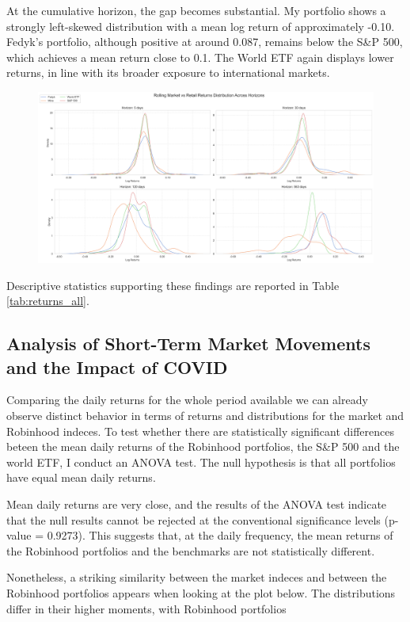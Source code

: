 At the cumulative horizon, the gap becomes substantial. My portfolio shows a strongly left-skewed distribution with a mean log return of approximately -0.10.
Fedyk’s portfolio, although positive at around 0.087, remains below the S\&P 500, which achieves a mean return close to 0.1. 
The World ETF again displays lower returns, in line with its broader exposure to international markets.
\begin{figure}[h!]
    \centering
    \includegraphics[width=1\linewidth]
    {../images/distributions/comparison_2.png}
\end{figure}

Descriptive statistics supporting these findings are reported in Table \ref{tab:returns_all}.

\subsection{Analysis of Short-Term Market Movements and the Impact of COVID}
Comparing the daily returns for the whole period available we can already observe distinct behavior in terms of returns and distributions for the market and Robinhood indeces.
To test whether there are statistically significant differences beteen the mean daily returns of the Robinhood portfolios, the S\&P 500 and the world ETF, I conduct an ANOVA test.
The null hypothesis is that all portfolios have equal mean daily returns.

Mean daily returns are very close, and the results of the ANOVA test indicate that the null results cannot be rejected at the conventional significance levels (p-value = 0.9273).
This suggests that, at the daily frequency, the mean returns of the Robinhood portfolios and the benchmarks are not statistically different.

Nonetheless, a striking similarity between the market indeces and between the Robinhood portfolios appears when looking at the plot below.
The distributions differ in their higher moments, with Robinhood portfolios 

